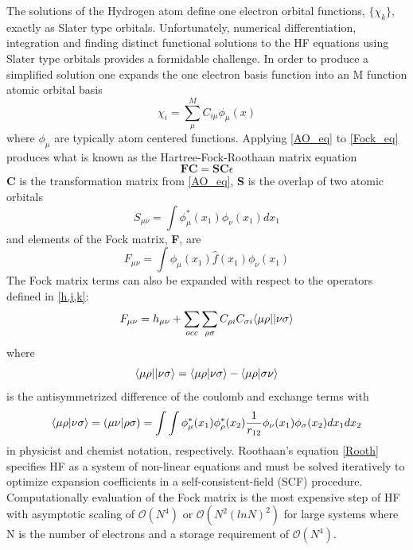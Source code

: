     The solutions of the Hydrogen atom define one electron orbital functions, $\{\chi_k\}$, exactly as Slater type orbitals. Unfortunately, numerical differentiation, integration and finding distinct functional solutions to the HF equations using Slater type orbitals provides a formidable challenge. In order to produce a simplified solution one expands the one electron basis function into an M function atomic orbital basis
      \begin{equation} \label{AO_eq}
      \chi_i = \sum_\mu^M C_{i\mu} \phi_\mu(x)
      \end{equation}
    where $\phi_\mu$ are typically atom centered functions.  Applying \cref{AO_eq} to \cref{Fock_eq} produces what is known as the Hartree-Fock-Roothaan matrix equation\cite{Roothaan 1960, Roothaan 1951}
      \begin{equation} \label{Rooth}
      \textbf{FC} = \textbf{SC}\epsilon
      \end{equation}
    \textbf{C} is the transformation matrix from \cref{AO_eq}, \textbf{S} is the overlap of two atomic orbitals
      \begin{equation}
      S_{\mu\nu} = \int \phi^*_\mu(x_1) \phi_\nu(x_1) dx_1
      \end{equation}
    and elements of the Fock matrix, \textbf{F}, are
      \begin{equation}
      F_{\mu\nu} = \int \phi_\mu(x_1) \hat{f}(x_1) \phi_\nu(x_1) 
      \end{equation}
    The Fock matrix terms can also be expanded with respect to the operators defined in \cref{h,j,k}:
      \begin{equation}
      F_{\mu\nu} = h_{\mu\nu} + \sum_{occ}\sum_{\rho \sigma} C_{\rho i} C_{\sigma i} \langle\mu \rho || \nu \sigma \rangle
      \end{equation}
    where 
      \begin{equation}
      \langle\mu \rho || \nu \sigma \rangle = \langle\mu \rho|\nu \sigma\rangle - \langle\mu \rho|\sigma \nu\rangle
      \end{equation}
    is the antisymmetrized difference of the coulomb and exchange terms with 
      \begin{equation} \label{antisymm}
      \langle\mu \rho|\nu \sigma\rangle = (\mu \nu | \rho \sigma) = \int \int \phi^*_\mu(x_1) \phi^*_\rho(x_2) \frac{1}{r_{12}} \phi_\nu (x_1) \phi_\sigma(x_2) dx_1 dx_2
      \end{equation}
    in physicist and chemist notation, respectively. Roothaan's equation \cref{Rooth} specifies HF as a system of non-linear equations and must be solved iteratively to optimize expansion coefficients in a self-consistent-field (SCF) procedure. Computationally evaluation of the Fock matrix is the most expensive step of HF with asymptotic scaling of $\mathcal{O}(N^4)$ or $\mathcal{O}(N^2(lnN)^2)$ for large systems where N is the number of electrons and a storage requirement of $\mathcal{O}(N^4)$.  
